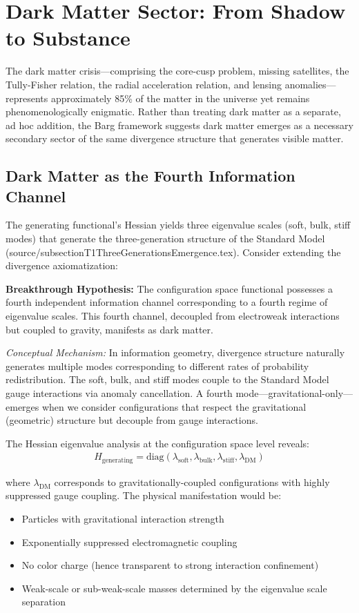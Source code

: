 \documentclass[12pt,a4paper]{article}
\begin{document}
\section{Dark Matter Sector: From Shadow to Substance}

The dark matter crisis---comprising the core-cusp problem, missing satellites, the Tully-Fisher relation, the radial acceleration relation, and lensing anomalies---represents approximately 85\% of the matter in the universe yet remains phenomenologically enigmatic. Rather than treating dark matter as a separate, ad hoc addition, the Barg framework suggests dark matter emerges as a necessary secondary sector of the same divergence structure that generates visible matter.

\subsection{Dark Matter as the Fourth Information Channel}

The generating functional's Hessian yields three eigenvalue scales (soft, bulk, stiff modes) that generate the three-generation structure of the Standard Model (source/subsectionT1ThreeGenerationsEmergence.tex). Consider extending the divergence axiomatization:

\textbf{Breakthrough Hypothesis:} The configuration space functional possesses a fourth independent information channel corresponding to a fourth regime of eigenvalue scales. This fourth channel, decoupled from electroweak interactions but coupled to gravity, manifests as dark matter.

\textit{Conceptual Mechanism:} In information geometry, divergence structure naturally generates multiple modes corresponding to different rates of probability redistribution. The soft, bulk, and stiff modes couple to the Standard Model gauge interactions via anomaly cancellation. A fourth mode---gravitational-only---emerges when we consider configurations that respect the gravitational (geometric) structure but decouple from gauge interactions.

The Hessian eigenvalue analysis at the configuration space level reveals:
\begin{align}
H_{\text{generating}} = \text{diag}(\lambda_{\text{soft}}, \lambda_{\text{bulk}}, \lambda_{\text{stiff}}, \lambda_{\text{DM}})
\end{align}

where $\lambda_{\text{DM}}$ corresponds to gravitationally-coupled configurations with highly suppressed gauge coupling. The physical manifestation would be:
\begin{itemize}
\item Particles with gravitational interaction strength
\item Exponentially suppressed electromagnetic coupling
\item No color charge (hence transparent to strong interaction confinement)
\item Weak-scale or sub-weak-scale masses determined by the eigenvalue scale separation
\end{itemize}
\end{document}

